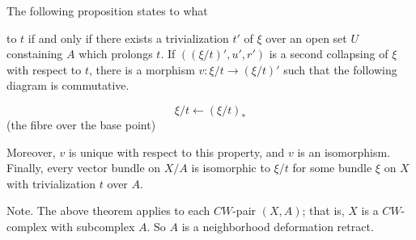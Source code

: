 The following proposition states to what

to $t$ if and only if there exists a trivialization $t'$ of $\xi$ over an open set $U$ constaining $A$ which prolongs $t$. If $((\xi/t)', u', r')$ is a second collapsing of $\xi$ with respect to $t$, there is a morphism $v: \xi/t \rightarrow (\xi/t)'$ such that the following diagram is commutative.

$$\xi/t \leftarrow (\xi/t)_\ast$$ (the fibre over the base point)

Moreover, $v$ is unique with respect to this property, and $v$ is an isomorphism. Finally, every vector bundle on $X/A$ is isomorphic to $\xi/t$ for some bundle $\xi$ on $X$ with trivialization $t$ over $A$.

Note. The above theorem applies to each $CW$-pair $(X, A)$; that is, $X$ is a $CW$-complex with subcomplex $A$. So $A$ is a neighborhood deformation retract.
